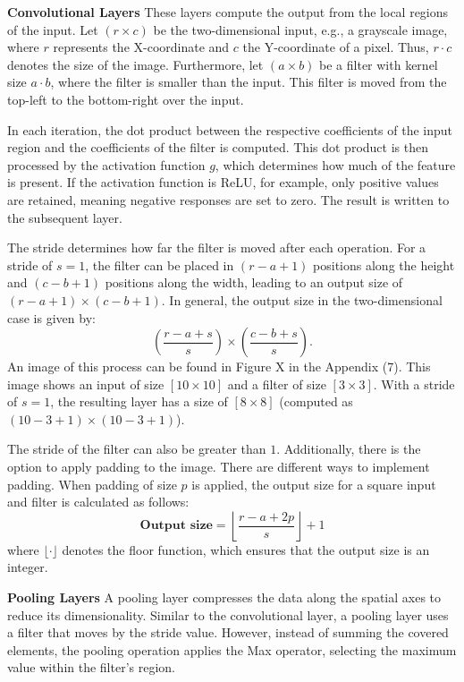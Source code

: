 \vspace{1em}

\textbf{Convolutional Layers}\label{theoretical_classification_conv_layers}
These layers compute the output from the local regions of the input. Let $(r \times c)$ be the two-dimensional input, e.g., a grayscale image, where $r$ represents the X-coordinate and $c$ the Y-coordinate of a pixel. Thus, $r \cdot c$ denotes the size of the image. Furthermore, let $(a \times b)$ be a filter with kernel size $a \cdot b$, where the filter is smaller than the input. This filter is moved from the top-left to the bottom-right over the input.

In each iteration, the dot product between the respective coefficients of the input region and the coefficients of the filter is computed. This dot product is then processed by the activation function $g$, which determines how much of the feature is present. If the activation function is ReLU, for example, only positive values are retained, meaning negative responses are set to zero. The result is written to the subsequent layer.

The stride determines how far the filter is moved after each operation. For a stride of $s = 1$, the filter can be placed in $(r - a + 1)$ positions along the height and $(c - b + 1)$ positions along the width, leading to an output size of $(r - a + 1) \times (c - b + 1)$. In general, the output size in the two-dimensional case is given by:
\[
\left( \frac{r - a + s}{s} \right) \times \left( \frac{c - b + s}{s} \right).
\]
An image of this process can be found in Figure X in the Appendix (7). This image shows an input of size $[10 \times 10]$ and a filter of size $[3 \times 3]$. With a stride of $s = 1$, the resulting layer has a size of $[8 \times 8]$ (computed as $\left(10 - 3 + 1\right) \times \left(10 - 3 + 1\right)$).

The stride of the filter can also be greater than $1$. Additionally, there is the option to apply padding to the image. There are different ways to implement padding. When padding of size $p$ is applied, the output size for a square input and filter is calculated as follows:
\[
\textbf{Output size} = \left\lfloor \frac{r - a + 2p}{s} \right\rfloor + 1
\]
where $\lfloor \cdot \rfloor$ denotes the floor function, which ensures that the output size is an integer.

\vspace{1em}

\textbf{Pooling Layers}\label{theoretical_classification_pooling_layers}
A pooling layer compresses the data along the spatial axes to reduce its dimensionality. Similar to the convolutional layer, a pooling layer uses a filter that moves by the stride value. However, instead of summing the covered elements, the pooling operation applies the Max operator, selecting the maximum value within the filter's region.


